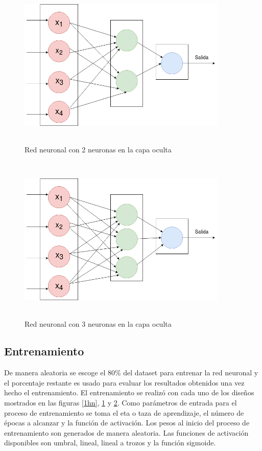 \documentclass[11pt]{article}
\begin{document}
\begin{figure}[h]
    \includegraphics[width=10cm, height=8cm]{2hn}
    \centering
    \caption{Red neuronal con 2 neuronas en la capa oculta}
    \label{2hn}
\end{figure}
\begin{figure}[h]
    \includegraphics[width=10cm, height=8cm]{3hn}
    \centering
    \caption{Red neuronal con 3 neuronas en la capa oculta}
    \label{3hn}
\end{figure}
\subsection{Entrenamiento}
De manera aleatoria se escoge  el 80\% del dataset para entrenar la red neuronal y el porcentaje
restante es usado para evaluar los resultados obtenidos una vez hecho el entrenamiento.
El entrenamiento se realiz\'o con cada uno de los dise\~nos mostrados en las figuras \ref{1hn}, \ref{2hn} y \ref{3hn}.
Como par\'ametros de entrada para el proceso de entrenamiento se toma el eta o taza de aprendizaje, el n\'umero de \'epocas a alcanzar y la funci\'on de activaci\'on.
Los pesos al inicio del proceso de entrenamiento son generados de manera aleatoria. Las funciones de activaci\'on disponibles son umbral, lineal, lineal a trozos y la función sigmoide.
\end{document}
